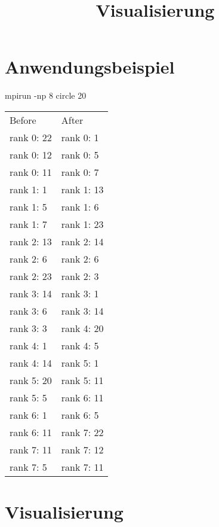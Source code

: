 \documentclass[fleqn]{article}
\title{Visualisierung}
\begin{document}
\section{Anwendungsbeispiel}
\begin{center}
mpirun -np 8 circle 20\\
\begin{tabular}{|l|l|}            \hline\hline
Before & After\\
rank 0: 22 & rank 0: 1\\ 
rank 0: 12 & rank 0: 5\\
rank 0: 11 & rank 0: 7\\
rank 1: 1 & rank 1: 13\\
rank 1: 5 & rank 1: 6\\
rank 1: 7 & rank 1: 23\\
rank 2: 13 & rank 2: 14\\
rank 2: 6 & rank 2: 6\\
rank 2: 23 & rank 2: 3\\
rank 3: 14 & rank 3: 1\\
rank 3: 6 & rank 3: 14\\
rank 3: 3 & rank 4: 20\\
rank 4: 1 & rank 4: 5\\
rank 4: 14 & rank 5: 1\\
rank 5: 20 & rank 5: 11\\
rank 5: 5 & rank 6: 11\\
rank 6: 1 & rank 6: 5\\
rank 6: 11 & rank 7: 22\\
rank 7: 11 & rank 7: 12\\
rank 7: 5 & rank 7: 11\\
\hline
\end{tabular}
\end{center}
\section{Visualisierung}
\end{document}
